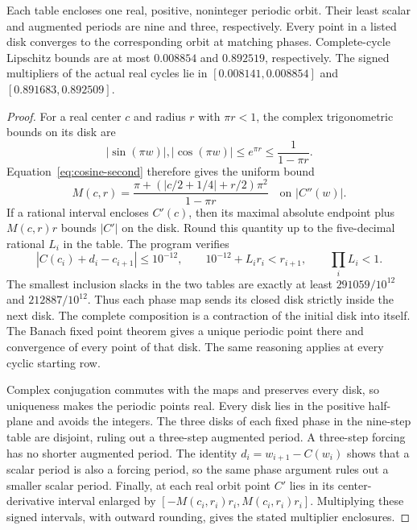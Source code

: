 \begin{proposition}
\label{prop:noninteger-traps}
Each table encloses one real, positive, noninteger periodic orbit.
Their least scalar and augmented periods are nine and three,
respectively. Every point in a listed disk converges to the
corresponding orbit at matching phases. Complete-cycle Lipschitz
bounds are at most $0.008854$ and $0.892519$, respectively. The
signed multipliers of the actual real cycles lie in
$[0.008141,0.008854]$ and $[0.891683,0.892509]$.
\end{proposition}
\begin{proof}
For a real center $c$ and radius $r$ with $\pi r<1$, the complex
trigonometric bounds on its disk are
\[
 |\sin(\pi w)|,|\cos(\pi w)|\le e^{\pi r}
 \le\frac1{1-\pi r}.
\]
Equation~\eqref{eq:cosine-second} therefore gives the uniform bound
\[
 M(c,r)=\frac{\pi+(|c/2+1/4|+r/2)\pi^2}{1-\pi r}
 \quad\text{on }|C''(w)|.
\]
If a rational interval encloses $C'(c)$, then its maximal absolute
endpoint plus $M(c,r)r$ bounds $|C'|$ on the disk. Round this quantity
up to the five-decimal rational $L_i$ in the table. The program
 verifies
\begin{equation}\label{eq:disk-inclusion}
 |C(c_i)+d_i-c_{i+1}|\le10^{-12},\qquad
 10^{-12}+L_i r_i<r_{i+1},\qquad \prod_iL_i<1.
\end{equation}
The smallest inclusion slacks in the two tables are exactly at least
$291059/10^{12}$ and $212887/10^{12}$. Thus each phase map sends its
closed disk strictly inside the next disk. The complete composition
is a contraction of the initial disk into itself. The Banach fixed
point theorem gives a unique periodic point there and convergence of
every point of that disk. The same reasoning applies at every cyclic
starting row.

Complex conjugation commutes with the maps and preserves every disk,
so uniqueness makes the periodic points real. Every disk lies in the
positive half-plane and avoids the integers. The three disks of each
fixed phase in the nine-step table are disjoint, ruling out a
three-step augmented period. A three-step forcing has no shorter
augmented period. The identity $d_i=w_{i+1}-C(w_i)$ shows that a
scalar period is also a forcing period, so the same phase argument
rules out a smaller scalar period. Finally, at each real orbit point
$C'$ lies in its center-derivative interval enlarged by
$[-M(c_i,r_i)r_i,M(c_i,r_i)r_i]$. Multiplying these signed intervals,
with outward rounding, gives the stated multiplier enclosures.
\end{proof}

